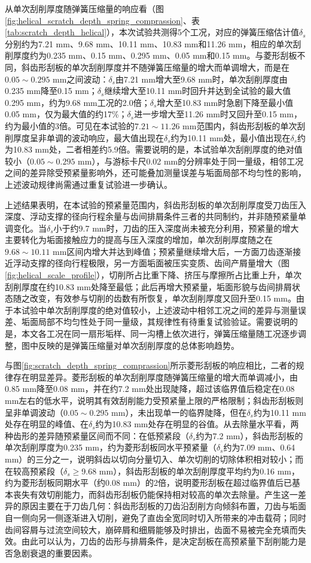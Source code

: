 从单次刮削厚度随弹簧压缩量的响应看（图\ref{fig:helical_scratch_depth_spring_comprassion}、表\ref{tab:scratch_depth_helical}），本次试验共测得5个工况，对应的弹簧压缩估计值$\delta_s$分别约为7.21 mm、9.68 mm、10.11 mm、10.83 mm和11.26 mm，相应的单次刮削厚度约为0.235 mm、0.15 mm、0.295 mm、0.05 mm和0.15 mm。与菱形刮板不同，斜齿形刮板的单次刮削厚度并不随弹簧压缩量的增大而单调增大，而是在$0.05\sim0.295$ mm之间波动：$\delta_s$由7.21 mm增大至9.68 mm时，单次刮削厚度由0.235 mm降至0.15 mm；$\delta_s$继续增大至10.11 mm时回升并达到全试验的最大值0.295 mm，约为9.68 mm工况的2.0倍；$\delta_s$增大至10.83 mm时急剧下降至最小值0.05 mm，仅为最大值的约17\%；$\delta_s$进一步增大至11.26 mm时又回升至0.15 mm，约为最小值的3倍。可见在本试验的$7.21\sim11.26$ mm范围内，斜齿形刮板的单次刮削厚度呈非单调的波动响应，最大值出现在$\delta_s$约为10.11 mm处，最小值出现在$\delta_s$约为10.83 mm处，二者相差约5.9倍。需要说明的是，本试验单次刮削厚度的绝对值较小（$0.05\sim0.295$ mm），与游标卡尺0.02 mm的分辨率处于同一量级，相邻工况之间的差异除受预紧量影响外，还可能叠加测量误差与垢面局部不均匀性的影响，上述波动规律尚需通过重复试验进一步确认。

上述结果表明，在本试验的预紧量范围内，斜齿形刮板的单次刮削厚度受刀齿压入深度、浮动支撑的径向行程余量与齿间排屑条件三者的共同制约，并非随预紧量单调变化。当$\delta_s$小于约9.7 mm时，刀齿的压入深度尚未被充分利用，预紧量的增大主要转化为垢面接触应力的提高与压入深度的增加，单次刮削厚度随之在$9.68\sim10.11$ mm区间内增大并达到峰值；预紧量继续增大后，一方面刀齿逐渐接近浮动支撑的径向行程极限，另一方面垢面被压实变质、齿间产屑量增大（图\ref{fig:helical_scale_profile}），切削所占比重下降、挤压与摩擦所占比重上升，单次刮削厚度在约10.83 mm处降至最低；此后再增大预紧量，垢面形貌与齿间排屑状态随之改变，有效参与切削的齿数有所恢复，单次刮削厚度又回升至0.15 mm。由于本试验中单次刮削厚度的绝对值较小，上述波动中相邻工况之间的差异与测量误差、垢面局部不均匀性处于同一量级，其规律性有待重复试验验证。需要说明的是，本文各工况在同一扇形垢样、同一沟槽上依次进行，弹簧压缩量随工况逐步调整，图中反映的是弹簧压缩量对单次刮削厚度的总体影响趋势。

与图\ref{fig:scratch_depth_spring_comprassion}所示菱形刮板的响应相比，二者的规律存在明显差异。菱形刮板的单次刮削厚度随弹簧压缩量的增大而单调减小，由0.85 mm降至0.08 mm，并在约7.2 mm处出现陡降，超过该临界值后稳定在0.08 mm左右的低水平，说明其有效刮削能力受预紧量上限的严格限制；斜齿形刮板则呈非单调波动（$0.05\sim0.295$ mm），未出现单一的临界陡降，但在$\delta_s$约为10.11 mm处存在明显的峰值、在$\delta_s$约为10.83 mm处存在明显的谷值。从去除量水平看，两种齿形的差异随预紧量区间而不同：在低预紧段（$\delta_s$约为7.2 mm），斜齿形刮板的单次刮削厚度为0.235 mm，约为菱形刮板同水平预紧量（$\delta_s$约为7.09 mm、0.64 mm）的三分之一，说明斜齿以切向分量切入、单次切削的切除体积相对较小；而在较高预紧段（$\delta_s\geq$9.68 mm），斜齿形刮板的单次刮削厚度平均约为0.16 mm，约为菱形刮板同期水平（约0.08 mm）的2倍，说明菱形刮板在超过临界值后已基本丧失有效切削能力，而斜齿形刮板仍能保持相对较高的单次去除量。产生这一差异的原因主要在于刀齿几何：斜齿形刮板的刀齿沿刮削方向倾斜布置，刀齿与垢面自一侧向另一侧逐渐进入切削，避免了直齿全宽同时切入所带来的冲击载荷；同时齿间容屑与过流空间较大，崩碎屑和细屑能够及时排出，齿面不易被完全充填而失效。由此可以认为，刀齿的齿形与排屑条件，是决定刮板在高预紧量下刮削能力是否急剧衰退的重要因素。

